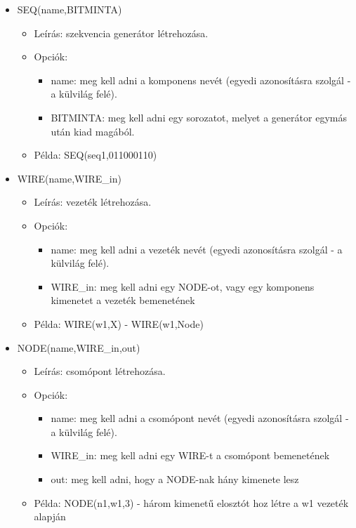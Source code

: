 \begin{itemize}
\item SEQ(name,BITMINTA)
	\begin{itemize}
	\item Leírás: szekvencia generátor létrehozása.
	\item Opciók: 
		\begin{itemize}
			\item name: meg kell adni a komponens nevét (egyedi azonosításra szolgál - a külvilág felé).
			\item BITMINTA: meg kell adni egy sorozatot, melyet a generátor egymás után kiad magából.
		\end{itemize}
	\item Példa: SEQ(seq1,011000110)
	\end{itemize}

\item WIRE(name,WIRE\_in)
	\begin{itemize}
	\item Leírás: vezeték létrehozása.
	\item Opciók: 
		\begin{itemize}
			\item name: meg kell adni a vezeték nevét (egyedi azonosításra szolgál - a külvilág felé).
			\item WIRE\_in: meg kell adni egy NODE-ot, vagy egy komponens kimenetet a vezeték bemenetének 
		\end{itemize}
	\item Példa: WIRE(w1,X) - WIRE(w1,Node)
	\end{itemize}	

\item NODE(name,WIRE\_in,out)
	\begin{itemize}
	\item Leírás: csomópont létrehozása.
	\item Opciók: 
		\begin{itemize}
			\item name: meg kell adni a csomópont nevét (egyedi azonosításra szolgál - a külvilág felé).
			\item WIRE\_in: meg kell adni egy WIRE-t a csomópont bemenetének 
			\item out: meg kell adni, hogy a NODE-nak hány kimenete lesz
		\end{itemize}
	\item Példa: NODE(n1,w1,3) - három kimenetű elosztót hoz létre a w1 vezeték alapján
	\end{itemize}
	

\end{itemize}
